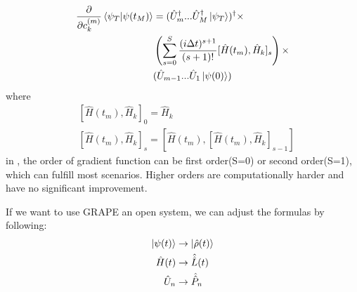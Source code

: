 \begin{equation}
    \begin{split}
        \frac{\partial}{\partial c_{k}^{(m)}}\braket{\psi_{T}|\psi(t_{M})}&=(\hat{U}_{m}^{\dagger}...\hat{U}_{M}^{\dagger}\ket{\psi_{T}})^{\dagger}\times\\
        &\left(\sum_{s=0}^{S}\frac{(i\Delta t)^{s+1}}{(s+1)!}[\hat{H}(t_m),\hat{H}_{k}]_s\right)\times\\
        &(\hat{U}_{m-1}...\hat{U}_{1}\ket{\psi(0)})
    \end{split}
\end{equation}
where
\begin{equation}
    \begin{split}
        &\left[\hat{H}(t_m),\hat{H}_{k}\right]_{0}=\hat{H}_{k}\\
        &\left[\hat{H}(t_m),\hat{H}_{k}\right]_{s}=\left[\hat{H}(t_m),\left[\hat{H}(t_m),\hat{H}_{k}\right]_{s-1}\right]
    \end{split}
\end{equation}
in \MindQuantum, the order of gradient function can be first order(S=0) or second order(S=1), which can fulfill most scenarios. Higher orders are computationally harder and have no significant improvement.

If we want to use GRAPE an open system, we can adjust the formulas by following:
\begin{equation}
\begin{split}
    \ket{\psi(t)}&\to \ket{\hat{\rho}(t)}\\
    \hat{H}(t)&\to \hat{\hat{L}}(t)\\
    \hat{U}_{n}&\to \hat{\hat{P}}_{n}\\
\end{split}
\end{equation}

